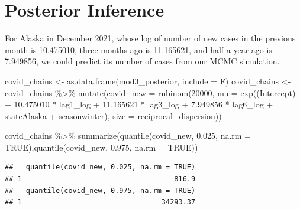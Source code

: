 \documentclass[
]{book}
\newenvironment{Shaded}{\begin{snugshade}}{\end{snugshade}}
\newcommand{\AttributeTok}[1]{\textcolor[rgb]{0.77,0.63,0.00}{#1}}
\newcommand{\ConstantTok}[1]{\textcolor[rgb]{0.00,0.00,0.00}{#1}}
\newcommand{\DecValTok}[1]{\textcolor[rgb]{0.00,0.00,0.81}{#1}}
\newcommand{\FloatTok}[1]{\textcolor[rgb]{0.00,0.00,0.81}{#1}}
\newcommand{\FunctionTok}[1]{\textcolor[rgb]{0.00,0.00,0.00}{#1}}
\newcommand{\NormalTok}[1]{#1}
\newcommand{\OtherTok}[1]{\textcolor[rgb]{0.56,0.35,0.01}{#1}}
\newcommand{\SpecialCharTok}[1]{\textcolor[rgb]{0.00,0.00,0.00}{#1}}
\newcommand{\StringTok}[1]{\textcolor[rgb]{0.31,0.60,0.02}{#1}}
\begin{document}
\hypertarget{posterior-inference}{%
\section{Posterior Inference}\label{posterior-inference}}

For Alaska in December 2021, whose log of number of new cases in the previous month is 10.475010, three months ago is 11.165621, and half a year ago is 7.949856, we could predict its number of cases from our MCMC simulation.

\begin{Shaded}
\begin{Highlighting}[]
\NormalTok{covid\_chains }\OtherTok{\textless{}{-}} \FunctionTok{as.data.frame}\NormalTok{(mod3\_posterior, }\AttributeTok{include =}\NormalTok{ F)}
\NormalTok{covid\_chains }\OtherTok{\textless{}{-}}\NormalTok{ covid\_chains }\SpecialCharTok{\%\textgreater{}\%}
  \FunctionTok{mutate}\NormalTok{(}\AttributeTok{covid\_new =} \FunctionTok{rnbinom}\NormalTok{(}\DecValTok{20000}\NormalTok{, }\AttributeTok{mu =} \FunctionTok{exp}\NormalTok{(}\StringTok{\textasciigrave{}}\AttributeTok{(Intercept)}\StringTok{\textasciigrave{}} \SpecialCharTok{+} \FloatTok{10.475010} \SpecialCharTok{*}\NormalTok{ lag1\_log }\SpecialCharTok{+} \FloatTok{11.165621} \SpecialCharTok{*}\NormalTok{ lag3\_log }\SpecialCharTok{+} \FloatTok{7.949856} \SpecialCharTok{*}\NormalTok{ lag6\_log }\SpecialCharTok{+}\NormalTok{ stateAlaska }\SpecialCharTok{+}\NormalTok{ seasonwinter), }\AttributeTok{size =}\NormalTok{ reciprocal\_dispersion))}
\end{Highlighting}
\end{Shaded}

\begin{Shaded}
\begin{Highlighting}[]
\NormalTok{covid\_chains }\SpecialCharTok{\%\textgreater{}\%}
  \FunctionTok{summarize}\NormalTok{(}\FunctionTok{quantile}\NormalTok{(covid\_new, }\FloatTok{0.025}\NormalTok{, }\AttributeTok{na.rm =} \ConstantTok{TRUE}\NormalTok{),}\FunctionTok{quantile}\NormalTok{(covid\_new, }\FloatTok{0.975}\NormalTok{, }\AttributeTok{na.rm =} \ConstantTok{TRUE}\NormalTok{))}
\end{Highlighting}
\end{Shaded}

\begin{verbatim}
##   quantile(covid_new, 0.025, na.rm = TRUE)
## 1                                    816.9
##   quantile(covid_new, 0.975, na.rm = TRUE)
## 1                                 34293.37
\end{verbatim}
\end{document}
